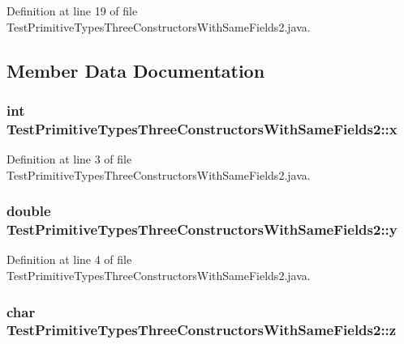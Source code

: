 Definition at line 19 of file TestPrimitiveTypesThreeConstructorsWithSameFields2.java.



\subsection{Member Data Documentation}
\hypertarget{classTestPrimitiveTypesThreeConstructorsWithSameFields2_a12541d3220601d6ee9aad996a9c0f80d}{
\subsubsection[{x}]{\setlength{\rightskip}{0pt plus 5cm}int {\bf TestPrimitiveTypesThreeConstructorsWithSameFields2::x}}}
\label{classTestPrimitiveTypesThreeConstructorsWithSameFields2_a12541d3220601d6ee9aad996a9c0f80d}


Definition at line 3 of file TestPrimitiveTypesThreeConstructorsWithSameFields2.java.

\hypertarget{classTestPrimitiveTypesThreeConstructorsWithSameFields2_abdd1cc774447a96460c59d9a208e8b67}{
\subsubsection[{y}]{\setlength{\rightskip}{0pt plus 5cm}double {\bf TestPrimitiveTypesThreeConstructorsWithSameFields2::y}}}
\label{classTestPrimitiveTypesThreeConstructorsWithSameFields2_abdd1cc774447a96460c59d9a208e8b67}


Definition at line 4 of file TestPrimitiveTypesThreeConstructorsWithSameFields2.java.

\hypertarget{classTestPrimitiveTypesThreeConstructorsWithSameFields2_afb46476d95f1cb84e71b6d991e3c916a}{
\subsubsection[{z}]{\setlength{\rightskip}{0pt plus 5cm}char {\bf TestPrimitiveTypesThreeConstructorsWithSameFields2::z}}}
\label{classTestPrimitiveTypesThreeConstructorsWithSameFields2_afb46476d95f1cb84e71b6d991e3c916a}


